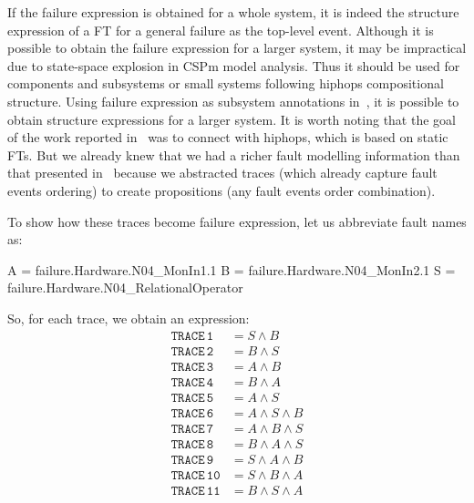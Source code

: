 \documentclass[12pt,openright,twoside,a4paper,oldfontcommands,english,brazil,final]{abntex2}
\theoremstyle{theo}
\newenvironment{snippetcspm}[1][2]
{
\ifthenelse{\equal{#1}{0}}
    {\tiny}
    {
    \ifthenelse{\equal{#1}{1}}
        {\scriptsize}
        {
        \ifthenelse{\equal{#1}{2}}
            {\footnotesize}
            {\small}
        }
    }
\verbatim
}
{
\endverbatim
}
\begin{document}
If the failure expression is obtained for a whole system, it is indeed the structure expression of a \acl{FT} for a general failure as the top-level event.
Although it is possible to obtain the failure expression for a larger system, it may be impractical due to state-space explosion in \ac{CSPm} model analysis.
Thus it should be used for components and subsystems or small systems following \ac{hiphops} compositional structure.
%
Using failure expression as subsystem annotations in~\cite{PMS+2001}, it is possible to obtain structure expressions for a larger system.
It is worth noting that the goal of the work reported in~\cite{DM2012} was to connect with \ac{hiphops}, which is based on static \aclp{FT}.
But we already knew that we had a richer fault modelling information than that presented in~\cite{DM2012} because we abstracted traces (which already capture fault events ordering) to create propositions (any fault events order combination).


To show how these traces become failure expression, let us abbreviate fault names as:
%
\begin{snippetcspm}[2]
A = failure.Hardware.N04_MonIn1.1
B = failure.Hardware.N04_MonIn2.1
S = failure.Hardware.N04_RelationalOperator
\end{snippetcspm}

So, for each trace, we obtain an expression:
\begin{align*}
\mathtt{TRACE\,1} &= S \land B\\
\mathtt{TRACE\,2} &= B \land S\\
\mathtt{TRACE\,3} &= A \land B\\
\mathtt{TRACE\,4} &= B \land A\\
\mathtt{TRACE\,5} &= A \land S\\
\mathtt{TRACE\,6} &= A \land S \land B\\
\mathtt{TRACE\,7} &= A \land B \land S\\
\mathtt{TRACE\,8} &= B \land A \land S\\
\mathtt{TRACE\,9} &= S \land A \land B\\
\mathtt{TRACE\,10} &= S \land B \land A\\
\mathtt{TRACE\,11} &= B \land S \land A\\
\end{align*}
\end{document}
